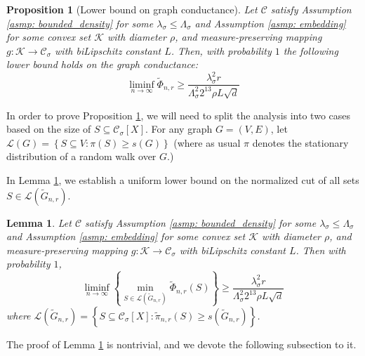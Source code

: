 \documentclass[11pt,twoside]{article}
\newtheorem{lemma}{Lemma}
\newtheorem{proposition}{Proposition}
\newcommand{\set}[1]{\left\{#1\right\}}
\newcommand{\1}{\mathbf{1}}
\newcommand{\Xbf}{X}             %
\newcommand{\Cset}{\mathcal{C}}
\newcommand{\Csig}{\Cset_{\sigma}}
\begin{document}
\begin{proposition}[Lower bound on graph conductance]
	\label{prop: graph_conductance_profile_lb}
	Let $\Cset$ satisfy Assumption \ref{asmp: bounded_density} for some $\lambda_{\sigma} \leq \Lambda_{\sigma}$ and Assumption \ref{asmp: embedding} for some convex set $\mathcal{K}$ with diameter $\rho$, and measure-preserving mapping $g: \mathcal{K} \to \Csig$ with biLipschitz constant $L$. Then, with probability $1$ the following lower bound holds on the graph conductance:
	\begin{equation*}
	\liminf_{n \to \infty} \widetilde{\Phi}_{n,r} \geq \frac{\lambda_{\sigma}^2 r}{\Lambda_{\sigma}^2 2^{13} \rho L \sqrt{d}}
	\end{equation*}
\end{proposition}

In order to prove Proposition \ref{prop: graph_conductance_profile_lb}, we will need to split the analysis into two cases based on the size of $S \subseteq \Csig[\Xbf]$. For any graph $G = (V,E)$, let $\mathcal{L}(G) = \set{S \subseteq V: \pi(S) \geq s(G)}$ (where as usual $\pi$ denotes the stationary distribution of a random walk over $G$.)

In Lemma \ref{lem: graph_conductance_profile_lb}, we establish a uniform lower bound on the normalized cut of all sets $S \in \mathcal{L}(\widetilde{G}_{n,r})$. 

\begin{lemma}
	\label{lem: graph_conductance_profile_lb}
	Let $\Cset$ satisfy Assumption \ref{asmp: bounded_density} for some $\lambda_{\sigma} \leq \Lambda_{\sigma}$ and Assumption \ref{asmp: embedding} for some convex set $\mathcal{K}$ with diameter $\rho$, and measure-preserving mapping $g: \mathcal{K} \to \Csig$ with biLipschitz constant $L$. Then with probability $1$,
	\begin{equation*}
	\liminf_{n \to \infty} \left\{ \min_{S \in \mathcal{L}(\widetilde{G}_{n,r})} \widetilde{\Phi}_{n,r}(S) \right\} \geq \frac{\lambda_{\sigma}^2 r}{\Lambda_{\sigma}^2 2^{13} \rho L \sqrt{d}}
	\end{equation*}
	where $\mathcal{L}(\widetilde{G}_{n,r}) = \set{S \subseteq \Csig[\Xbf]: \widetilde{\pi}_{n,r}(S) \geq s(\widetilde{G}_{n,r})}$.
\end{lemma}

The proof of Lemma \ref{lem: graph_conductance_profile_lb} is nontrivial, and we devote the following subsection to it. 
\end{document}

